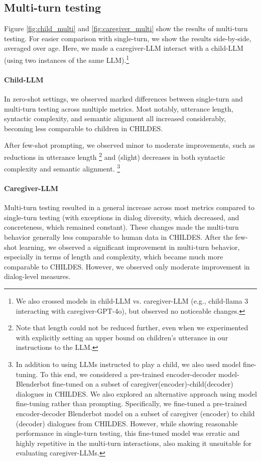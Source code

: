 \subsection{Multi-turn testing}

Figure \ref{fig:child_multi} and \ref{fig:caregiver_multi} show the results of multi-turn testing. For easier comparison with single-turn, we show the results side-by-side, averaged over age. Here, we made a caregiver-LLM interact with a child-LLM (using two instances of the same LLM).\footnote{We also crossed models in child-LLM vs. caregiver-LLM (e.g., child-llama 3 interacting with caregiver-GPT-4o), but observed no noticeable changes.}


\paragraph{Child-LLM} In zero-shot settings, we observed marked differences between single-turn and multi-turn testing across multiple metrics. Most notably, utterance length, syntactic complexity, and semantic alignment all increased considerably, becoming less comparable to children in CHILDES. 


After few-shot prompting, we observed minor to moderate improvements, such as reductions in utterance length \footnote{Note that length could not be reduced further, even when we experimented with explicitly setting an upper bound on children's utterance in our instructions to the LLM.} and (slight) decreases in both syntactic complexity and semantic alignment. \footnote{In addition to using LLMs instructed to play a child, we also used model fine-tuning. To this end, we considered a pre-trained encoder-decoder model- Blenderbot fine-tuned on a subset of caregiver(encoder)-child(decoder) dialogues in CHILDES. We also explored an alternative approach using model fine-tuning rather than prompting. Specifically, we fine-tuned a pre-trained encoder-decoder Blenderbot model on a subset of caregiver (encoder) to child (decoder) dialogues from CHILDES. However, while showing reasonable performance in single-turn testing, this fine-tuned model was erratic and highly repetitive in the multi-turn interactions, also making it unsuitable for evaluating caregiver-LLMs.}


\paragraph{Caregiver-LLM} Multi-turn testing resulted in a general increase across most metrics compared to single-turn testing (with exceptions in dialog diversity, which decreased, and concreteness, which remained constant). These changes made the multi-turn behavior generally less comparable to human data in CHILDES. After the few-shot learning, we observed a significant improvement in multi-turn behavior, especially in terms of length and complexity, which became much more comparable to CHILDES. However, we observed only moderate improvement in dialog-level measures. 


